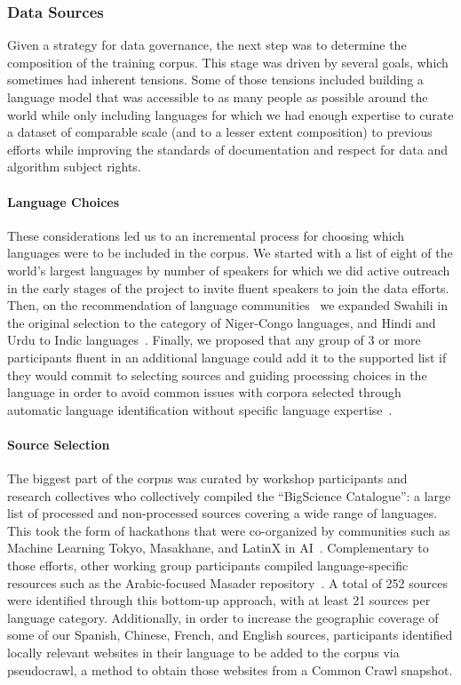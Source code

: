 \documentclass[twoside,11pt]{article}
\begin{document}
\subsubsection{Data Sources}
\label{sec:sourcing}

Given a strategy for data governance, the next step was to determine the composition of the training corpus. This stage was driven by several goals, which sometimes had inherent tensions.
Some of those tensions included building a language model that was accessible to as many people as possible around the world while only including languages for which we had enough expertise to curate a dataset of comparable scale (and to a lesser extent composition) to previous efforts while improving the standards of documentation and respect for data and algorithm subject rights.

\paragraph{Language Choices} These considerations led us to an incremental process for choosing which languages were to be included in the corpus. We started with a list of eight of the world's largest languages by number of speakers for which we did active outreach in the early stages of the project to invite fluent speakers to join the data efforts. Then, on the recommendation of language communities~\citep{nekoto2020participatory} we expanded Swahili in the original selection to the category of Niger-Congo languages, and Hindi and Urdu to Indic languages~\citep{kunchukuttan2020indic}. Finally, we proposed that any group of 3 or more participants fluent in an additional language could add it to the supported list if they would commit to selecting sources and guiding processing choices in the language in order to avoid common issues with corpora selected through automatic language identification without specific language expertise~\citep{caswell2022quality}.

\paragraph{Source Selection} The biggest part of the corpus was curated by workshop participants and research collectives who collectively compiled the ``BigScience Catalogue'': a large list of processed and non-processed sources covering a wide range of languages. This took the form of hackathons that were co-organized by communities such as Machine Learning Tokyo, Masakhane, and LatinX in AI~\citep{mcmillan-major2022documenting}. Complementary to those efforts, other working group participants compiled language-specific resources such as the Arabic-focused Masader repository~\citep{alyafeai2021masader,alyafeai2022masader}. A total of 252 sources were identified through this bottom-up approach, with at least 21 sources per language category. Additionally, in order to increase the geographic coverage of some of our Spanish, Chinese, French, and English sources, participants identified locally relevant websites in their language to be added to the corpus via pseudocrawl, a method to obtain those websites from a Common Crawl snapshot.
\end{document}

